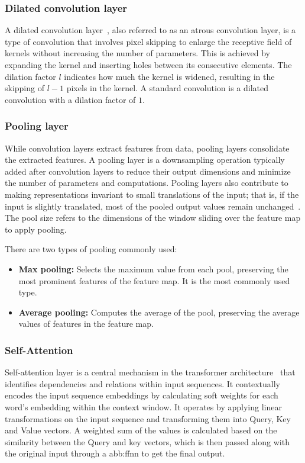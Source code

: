         
        \subsubsection{Dilated convolution layer}
            A dilated convolution layer~\cite{dilated}, also referred to as an atrous convolution layer, is a type of convolution that involves pixel skipping to enlarge the receptive field of kernels without increasing the number of parameters. This is achieved by expanding the kernel and inserting holes between its consecutive elements. The dilation factor $l$ indicates how much the kernel is widened, resulting in the skipping of $l-1$ pixels in the kernel. A standard convolution is a dilated convolution with a dilation factor of $1$.

        \subsubsection{Pooling layer}
            While convolution layers extract features from data, pooling layers consolidate the extracted features. A pooling layer is a downsampling operation typically added after convolution layers to reduce their output dimensions and minimize the number of parameters and computations. Pooling layers also contribute to making representations invariant to small translations of the input; that is, if the input is slightly translated, most of the pooled output values remain unchanged~\cite{dlbook}. The pool size refers to the dimensions of the window sliding over the feature map to apply pooling.

            There are two types of pooling commonly used:
            \begin{itemize}
                \item  \textbf{Max pooling:} Selects the maximum value from each pool, preserving the most prominent features of the feature map. It is the most commonly used type.
                \item \textbf{Average pooling:} Computes the average of the pool, preserving the average values of features in the feature map.
            \end{itemize}

        \subsubsection{Self-Attention}
            Self-attention layer is a central mechanism in the transformer architecture~\cite{attention} that identifies dependencies and relations within input sequences. It contextually encodes the input sequence embeddings by calculating soft weights for each word’s embedding within the context window. It operates by applying linear transformations on the input sequence and transforming them into Query, Key and Value vectors. A weighted sum of the values is calculated based on the similarity between the Query and key vectors, which is then passed along with the original input through a \gls{abb:ffnn} to get the final output.
    
